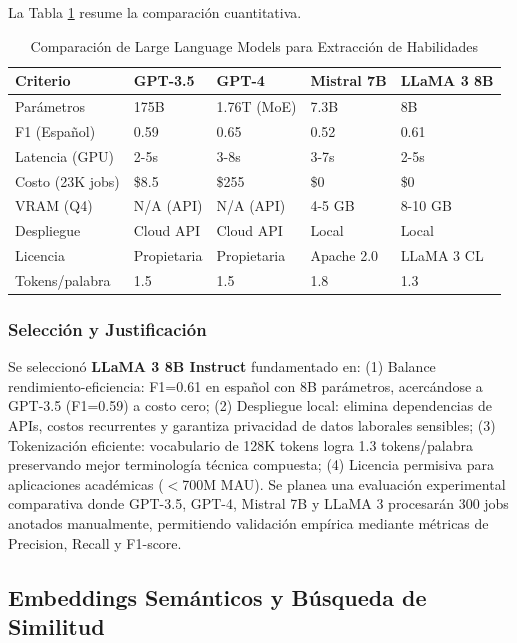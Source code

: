 La Tabla \ref{tab:comparacion-llms} resume la comparación cuantitativa.

\begin{table}[H]
\centering
\caption{Comparación de Large Language Models para Extracción de Habilidades}
\label{tab:comparacion-llms}
\begin{tabular}{|p{2.5cm}|p{2cm}|p{2cm}|p{2cm}|p{2cm}|}
\hline
\textbf{Criterio} & \textbf{GPT-3.5} & \textbf{GPT-4} & \textbf{Mistral 7B} & \textbf{LLaMA 3 8B} \\
\hline
Parámetros & 175B & 1.76T (MoE) & 7.3B & 8B \\
\hline
F1 (Español) & 0.59 & 0.65 & 0.52 & 0.61 \\
\hline
Latencia (GPU) & 2-5s & 3-8s & 3-7s & 2-5s \\
\hline
Costo (23K jobs) & \$8.5 & \$255 & \$0 & \$0 \\
\hline
VRAM (Q4) & N/A (API) & N/A (API) & 4-5 GB & 8-10 GB \\
\hline
Despliegue & Cloud API & Cloud API & Local & Local \\
\hline
Licencia & Propietaria & Propietaria & Apache 2.0 & LLaMA 3 CL \\
\hline
Tokens/palabra & 1.5 & 1.5 & 1.8 & 1.3 \\
\hline
\end{tabular}
\end{table}

\subsubsection{Selección y Justificación}

Se seleccionó \textbf{LLaMA 3 8B Instruct} fundamentado en: (1) Balance rendimiento-eficiencia: F1=0.61 en español con 8B parámetros, acercándose a GPT-3.5 (F1=0.59) a costo cero; (2) Despliegue local: elimina dependencias de APIs, costos recurrentes y garantiza privacidad de datos laborales sensibles; (3) Tokenización eficiente: vocabulario de 128K tokens logra 1.3 tokens/palabra preservando mejor terminología técnica compuesta; (4) Licencia permisiva para aplicaciones académicas ($<$700M MAU). Se planea una evaluación experimental comparativa donde GPT-3.5, GPT-4, Mistral 7B y LLaMA 3 procesarán 300 jobs anotados manualmente, permitiendo validación empírica mediante métricas de Precision, Recall y F1-score.

\subsection{Embeddings Semánticos y Búsqueda de Similitud}

